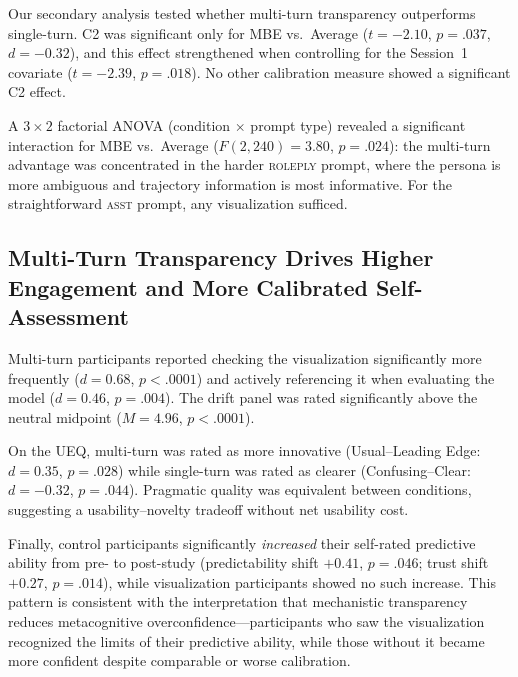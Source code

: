 Our secondary analysis tested whether multi-turn transparency
outperforms single-turn. C2 was significant only for MBE vs.\ Average
($t = -2.10$, $p = .037$, $d = -0.32$), and this effect strengthened
when controlling for the Session~1 covariate ($t = -2.39$, $p = .018$).
No other calibration measure showed a significant C2 effect.

A $3 \times 2$ factorial ANOVA (condition $\times$ prompt type) revealed
a significant interaction for MBE vs.\ Average ($F(2,240) = 3.80$,
$p = .024$): the multi-turn advantage was concentrated in the harder
\textsc{roleply} prompt, where the persona is more ambiguous and
trajectory information is most informative. For the straightforward
\textsc{asst} prompt, any visualization sufficed.

\subsection{Multi-Turn Transparency Drives Higher Engagement and More
Calibrated Self-Assessment}

Multi-turn participants reported checking the visualization
significantly more frequently ($d = 0.68$, $p < .0001$) and actively
referencing it when evaluating the model ($d = 0.46$, $p = .004$). The
drift panel was rated significantly above the neutral midpoint
($M = 4.96$, $p < .0001$).

On the UEQ, multi-turn was rated as more innovative (Usual--Leading
Edge: $d = 0.35$, $p = .028$) while single-turn was rated as clearer
(Confusing--Clear: $d = -0.32$, $p = .044$). Pragmatic quality was
equivalent between conditions, suggesting a usability--novelty tradeoff
without net usability cost.

Finally, control participants significantly \emph{increased} their
self-rated predictive ability from pre- to post-study (predictability
shift $+0.41$, $p = .046$; trust shift $+0.27$, $p = .014$), while
visualization participants showed no such increase. This pattern is
consistent with the interpretation that mechanistic transparency
reduces metacognitive overconfidence---participants who saw the
visualization recognized the limits of their predictive ability, while
those without it became more confident despite comparable or worse
calibration.
